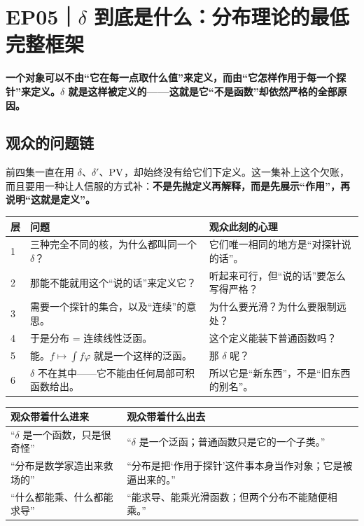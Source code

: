 \chapter{EP05｜$\delta$ 到底是什么：分布理论的最低完整框架}

\begin{ideabox}[这一集的一句话]
\textbf{一个对象可以不由“它在每一点取什么值”来定义，而由“它怎样作用于每一个探针”来定义。$\delta$ 就是这样被定义的——这就是它“不是函数”却依然严格的全部原因。}
\end{ideabox}

\section{观众的问题链}

前四集一直在用 $\delta$、$\delta'$、$\operatorname{PV}$，却始终没有给它们下定义。这一集补上这个欠账，而且要用一种让人信服的方式补：\textbf{不是先抛定义再解释，而是先展示“作用”，再说明“这就是定义”。}

\begin{center}
\small
\renewcommand{\arraystretch}{1.32}
\begin{tabularx}{\textwidth}{@{}p{0.8cm}X p{4.4cm}@{}}
\toprule
层 & 问题 & 观众此刻的心理 \\
\midrule
1 & 三种完全不同的核，为什么都叫同一个 $\delta$？ & 它们唯一相同的地方是“对探针说的话”。\\
2 & 那能不能就用这个“说的话”来定义它？ & 听起来可行，但“说的话”要怎么写得严格？\\
3 & 需要一个探针的集合，以及“连续”的意思。 & 为什么要光滑？为什么要限制远处？\\
4 & 于是分布 = 连续线性泛函。 & 这个定义能装下普通函数吗？\\
5 & 能。$f\mapsto\int f\varphi$ 就是一个这样的泛函。 & 那 $\delta$ 呢？\\
6 & $\delta$ 不在其中——它不能由任何局部可积函数给出。 & 所以它是“新东西”，不是“旧东西的别名”。\\
\bottomrule
\end{tabularx}
\end{center}

\begin{center}
\small
\renewcommand{\arraystretch}{1.32}
\begin{tabularx}{\textwidth}{@{}p{3.2cm}Y@{}}
\toprule
观众带着什么进来 & 观众带着什么出去 \\
\midrule
“$\delta$ 是一个函数，只是很奇怪” & “$\delta$ 是一个泛函；普通函数只是它的一个子类。”\\
“分布是数学家造出来救场的” & “分布是把‘作用于探针’这件事本身当作对象；它是被逼出来的。”\\
“什么都能乘、什么都能求导” & “能求导、能乘光滑函数；但两个分布不能随便相乘。”\\
\bottomrule
\end{tabularx}
\end{center}

